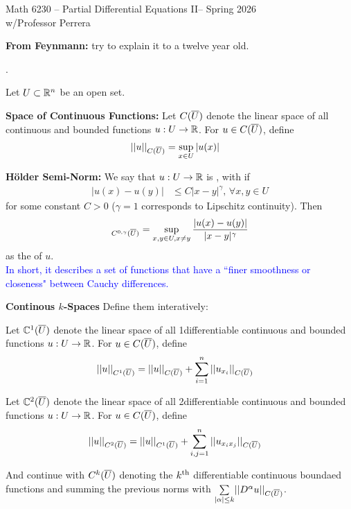 \documentclass[12pt,a4paper]{report}
\newcommand{\CLASSNAME}{Math 6230 -- Partial Differential Equations II}
\newcommand{\PROFESSOR}{Professor Perrera}
\newcommand{\SEMESTER}{Spring 2026}
\newcommand{\BLUE}[1]{\textcolor{blue}{#1}}
\newcommand{\CSPACE}{{C(\CONJ{U})}}
\newcommand{\CNORM}[1]{|| #1 ||_\CSPACE}
\newcommand{\HSPACE}[3]{C^{#1,#2}(#3)}
\newcommand{\HSEMINORM}[4]{[ #4 ]_{\HSPACE{#1}{#2}{#3}}}
\begin{document}
\begin{center}
	\Large{\CLASSNAME -- \SEMESTER} \\
	\large{ w/\PROFESSOR}
\end{center}

\textbf{From Feynmann:} try to explain it to a twelve year old.
\begin{definition}.
	
	Let $U \subset \mathbb{R}^n$ be an open set.  
	
	\begin{description}
		\item \textbf{Space of Continuous Functions:} Let $\CSPACE$ denote the linear space of all continuous and bounded functions $u:U\to \mathbb{R}$.  For $u \in \CSPACE$, define 
	\begin{align*}
		\CNORM{u} &= \sup_{x\in U} |u(x)|
	\end{align*}
	
	\item \textbf{H\"older Semi-Norm:} We say that $u:U\to \mathbb{R}$ is , with \DEFINE{H\"older exponent $\gamma \in (0,1]$} if
	\begin{align*}
		|u(x)-u(y)| &\le C|x-y|^\gamma, \, \forall x,y \in U
	\end{align*}for some constant $C>0$ ($\gamma=1$ corresponds to Lipschitz continuity).  Then
	\begin{align*}
		\HSEMINORM{0}{\gamma}{\CONJ{U}}{u} = \sup_{x,y \in U,x\ne y}\frac{|u(x)-u(y)|}{|x-y|^\gamma}
	\end{align*}as the  of $u$.\\
	
	\BLUE{In short, it describes a set of functions that have a ``finer smoothness or closeness" between Cauchy differences.}
	
	\item \textbf{Continous $k$-Spaces} Define them interatively:
	\begin{description}
		\item Let $\mathbb{C}^1(\overline{U})$ denote the linear space of all 1\FST differentiable continuous and bounded functions $u:U\to \mathbb{R}$.  For $u \in \CSPACE$, define 
	\begin{align*}
		||u||_{C^1(\CONJ{U})} &= \CNORM{u} + \sum_{i=1}^n \CNORM{u_{x_i}} 
	\end{align*}
	\item Let $\mathbb{C}^2(\overline{U})$ denote the linear space of all 2\SND differentiable continuous and bounded functions $u:U\to \mathbb{R}$.  For $u \in \CSPACE$, define 
	\begin{align*}
		||u||_{C^2(\CONJ{U})} &= ||u||_{C^1(\CONJ{U})} + \sum_{i,j=1}^n \CNORM{u_{x_ix_j}} 
	\end{align*}
	\item And continue with $C^k(\overline{U})$ denoting the $k\textsuperscript{th}$ differentiable continuous boundaed functions and  summing the previous norms with $\SUM{|\alpha|\le k}{}\CNORM{D^\alpha u}$.
	

\end{description}
\end{description}
\end{definition}
\end{document}
